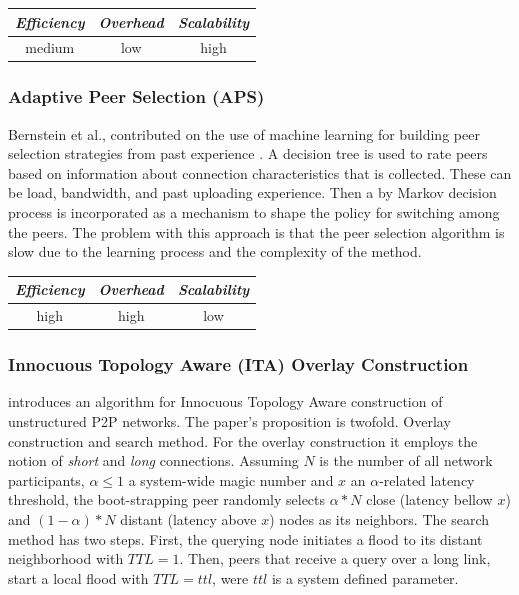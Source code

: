 \begin{center}
\begin{tabular}{ccc}
\emph{Efficiency} & \emph{Overhead} & \emph{Scalability} \\
\hline
medium &
low &
high
\end{tabular}
\end{center}

\subsubsection{Adaptive Peer Selection (APS)}
Bernstein et al., contributed on the use of machine learning for building peer
selection strategies from past experience \cite{BFLZ2003}. A decision tree is
used to rate peers based on information about connection characteristics that is
collected. These can be load, bandwidth, and past uploading experience. Then a
by Markov decision process is incorporated as a mechanism to shape the policy
for switching among the peers. The problem with this approach is that the peer
selection algorithm is slow due to the learning process and the complexity of
the method.

\begin{center}
\begin{tabular}{ccc}
\emph{Efficiency} & \emph{Overhead} & \emph{Scalability} \\
\hline
high &
high &
%
low
\end{tabular}
\end{center}

\subsubsection{Innocuous Topology Aware (ITA) Overlay Construction}
\cite{PRFM2009} introduces an algorithm for Innocuous Topology Aware
construction of unstructured P2P networks. The paper's proposition is twofold.
Overlay construction and search method. For the overlay construction it employs
the notion of \emph{short} and \emph{long} connections. Assuming $N$ is the
number of all network participants, $\alpha \leq 1 $ a system-wide magic number
and $x$ an $\alpha$-related latency threshold, the boot-strapping peer randomly
selects $\alpha \ast N$ close (latency bellow $x$) and
$\left( 1 - \alpha \right) \ast N$ distant (latency above $x$) nodes as its
neighbors. The search method has two steps. First, the querying node initiates a
flood to its distant neighborhood with $TTL = 1$. Then, peers that receive a
query over a long link, start a local flood with $TTL = ttl$, were $ttl$ is a
system defined parameter.

